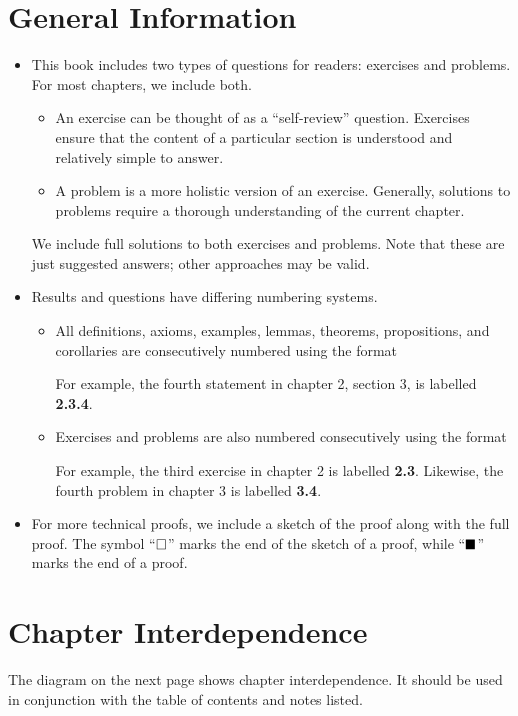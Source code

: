 \section*{General Information}
\begin{itemize}
    \item This book includes two types of questions for readers: exercises and problems. For most chapters, we include both.
    \begin{itemize}
        \item An exercise can be thought of as a ``self-review'' question. Exercises ensure that the content of a particular section is understood and relatively simple to answer.
        \item A problem is a more holistic version of an exercise. Generally, solutions to problems require a thorough understanding of the current chapter.
    \end{itemize}
    We include full solutions to both exercises and problems. Note that these are just suggested answers; other approaches may be valid.

    \item Results and questions have differing numbering systems.
    \begin{itemize}
        \item All definitions, axioms, examples, lemmas, theorems, propositions, and corollaries are consecutively numbered using the format
        \begin{quote}
        \end{quote}
        For example, the fourth statement in chapter 2, section 3, is labelled \textbf{2.3.4}.
        \item Exercises and problems are also numbered consecutively using the format
        \begin{quote}
        \end{quote}
        For example, the third exercise in chapter 2 is labelled \textbf{2.3}. Likewise, the fourth problem in chapter 3 is labelled \textbf{3.4}.
    \end{itemize}
    \item For more technical proofs, we include a sketch of the proof along with the full proof. The symbol ``$\square$'' marks the end of the sketch of a proof, while ``$\blacksquare$'' marks the end of a proof.
\end{itemize}

\section*{Chapter Interdependence}
The diagram on the next page shows chapter interdependence. It should be used in conjunction with the table of contents and notes listed.

